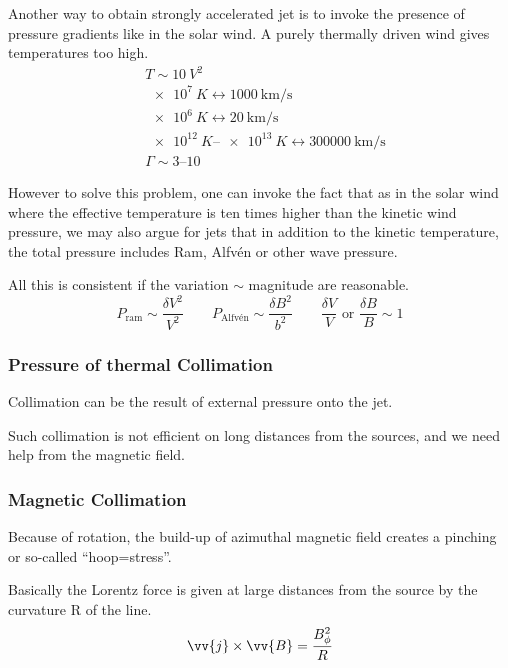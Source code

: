 \documentclass[10pt,a4paper,english]{article}
\begin{document}
Another way to obtain strongly accelerated jet is to invoke the presence of
pressure gradients like in the solar wind. A purely thermally driven wind gives
temperatures too high.
\begin{align*}
    & T \sim \SI{10}{V^2} \\
    & \SI{e7}{K} \leftrightarrow	  \SI{1000}{\km\per \s } \\
    & \SI{e6}{K} \leftrightarrow \SI{20}{\km \per\s}  \\
    &\SIrange{e12}{e13}{K} \leftrightarrow  \SI{300000}{\km \per \s} \\
    & \Gamma \sim \numrange{3}{10}
\end{align*}

However to solve this problem, one can invoke the fact that as in the solar
wind where the effective temperature is ten times higher than the kinetic wind
pressure, we may also argue for jets that in addition to the kinetic
temperature, the total pressure includes Ram, Alfvén or other wave pressure.


All this is consistent if the variation $\sim$ magnitude are reasonable.
\begin{equation}
    P_\mathrm{ram} \sim \frac{\delta V^2}{V^2} \qquad
    P_\textrm{Alfvén}	\sim \frac{\delta B^2}{b^2} \qquad
    \frac{\delta V}{V } \text{ or } \frac{\delta B}{B} \sim 1
\end{equation}

\subsubsection{Pressure of thermal Collimation}

Collimation can be the result of external pressure onto the jet.


Such collimation is not efficient on long distances from the sources, and we
need help from the magnetic field.

\subsubsection{Magnetic Collimation}

Because of rotation, the build-up of azimuthal magnetic field creates a
pinching or so-called ``hoop=stress''.


Basically the Lorentz force is given at large distances from the source by the
curvature R of the line.
\begin{equation}
    \vv{j} \times \vv{B} = \frac{B^2_{\phi}}{R}
\end{equation}
\end{document}
